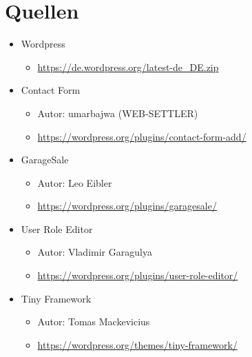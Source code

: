 \documentclass[a4paper, DIV20, 11pt, headsepline, parskip]{article}
\begin{document}
\section{Quellen}
\begin{itemize}
\item Wordpress
\begin{itemize}
\item \url{https://de.wordpress.org/latest-de_DE.zip}
\end{itemize}
\item Contact Form
\begin{itemize}
\item Autor: umarbajwa (WEB-SETTLER)
\item \url{https://wordpress.org/plugins/contact-form-add/}
\end{itemize}
\item GarageSale
\begin{itemize}
\item Autor: Leo Eibler
\item \url{https://wordpress.org/plugins/garagesale/}
\end{itemize}
\item User Role Editor
\begin{itemize}
\item Autor: Vladimir Garagulya
\item \url{https://wordpress.org/plugins/user-role-editor/}
\end{itemize}
\item Tiny Framework
\begin{itemize}
\item Autor: Tomas Mackevicius
\item \url{https://wordpress.org/themes/tiny-framework/}
\end{itemize}
\end{itemize}

\end{document}

